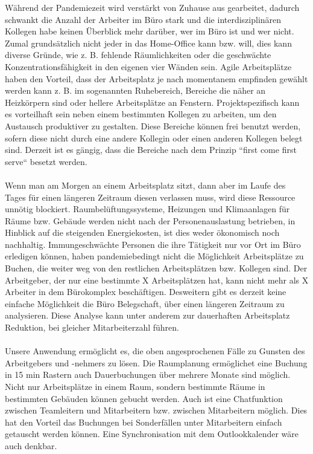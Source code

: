 \documentclass{article}
\begin{document}
Während der Pandemiezeit wird verstärkt von Zuhause aus gearbeitet, dadurch schwankt die Anzahl der Arbeiter im Büro stark und die interdisziplinären Kollegen habe keinen Überblick mehr darüber, wer im Büro ist und wer nicht. Zumal grundsätzlich nicht jeder in das Home-Office kann bzw. will, dies kann diverse Gründe, wie z. B. fehlende Räumlichkeiten oder die geschwächte Konzentrationsfähigkeit in den eigenen vier Wänden sein. Agile Arbeitsplätze haben den Vorteil, dass der Arbeitsplatz je nach momentanem empfinden gewählt werden kann z. B. im sogenannten Ruhebereich, Bereiche die näher an Heizkörpern sind oder hellere Arbeitsplätze an Fenstern. Projektspezifisch kann es vorteilhaft sein neben einem bestimmten Kollegen zu arbeiten, um den Austausch produktiver zu gestalten. Diese Bereiche können frei benutzt werden, sofern diese nicht durch eine andere Kollegin oder einen anderen Kollegen belegt sind. Derzeit ist es gängig, dass die Bereiche nach dem Prinzip “first come first serve“ besetzt werden.\\\\
Wenn man am Morgen an einem Arbeitsplatz sitzt, dann aber im Laufe des Tages für einen längeren Zeitraum diesen verlassen muss, wird diese Ressource unnötig blockiert. Raumbelüftungssysteme, Heizungen und Klimaanlagen für Räume bzw. Gebäude werden nicht nach der Personenauslastung betrieben, in Hinblick auf die steigenden Energiekosten, ist dies weder ökonomisch noch nachhaltig.
Immungeschwächte Personen die ihre Tätigkeit nur vor Ort im Büro erledigen können, haben pandemiebedingt nicht die Möglichkeit Arbeitsplätze zu Buchen, die weiter weg von den restlichen Arbeitsplätzen bzw. Kollegen sind. Der Arbeitgeber, der nur eine bestimmte X Arbeitsplätzen hat, kann nicht mehr als X Arbeiter in dem Bürokomplex beschäftigen. Desweitern gibt es derzeit keine einfache Möglichkeit die Büro Belegschaft, über einen längeren Zeitraum zu analysieren. Diese Analyse kann unter anderem zur dauerhaften Arbeitsplatz Reduktion, bei gleicher Mitarbeiterzahl führen.\\\\
Unsere Anwendung ermöglicht es, die oben angesprochenen Fälle zu Gunsten des Arbeitgebers und -nehmers zu lösen.  Die Raumplanung ermöglichet eine Buchung in 15 min Rastern auch Dauerbuchungen über mehrere Monate sind möglich. Nicht nur Arbeitsplätze in einem Raum, sondern bestimmte Räume in bestimmten Gebäuden können gebucht werden. Auch ist eine Chatfunktion zwischen Teamleitern und Mitarbeitern bzw. zwischen Mitarbeitern möglich. Dies hat den Vorteil das Buchungen bei Sonderfällen unter Mitarbeitern einfach getauscht werden können. Eine Synchronisation mit dem Outlookkalender wäre auch denkbar.
\end{document}
